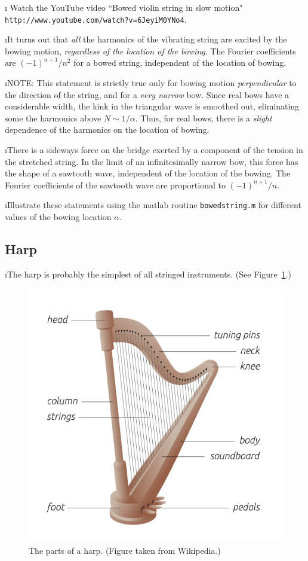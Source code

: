 \i \demo
Watch the YouTube video
``Bowed violin string in slow motion"\\
{\tt http://www.youtube.com/watch?v=6JeyiM0YNo4}.

\i It turns out that {\em all} the harmonics of 
the vibrating string are excited by the bowing motion, 
{\em regardless of the location of the bowing}.
The Fourier coefficients are $(-1)^{n+1}/n^2$
for a bowed string, independent of the location of bowing.

\i NOTE:
This statement is strictly true only for bowing 
motion {\em perpendicular} to the direction of 
the string, and for a {\em very narrow} bow.
Since real bows have a considerable width,
the kink in the triangular wave is smoothed out, 
eliminating some the harmonics above 
$N\sim 1/\alpha$.
Thus, for real bows, there is a {\em slight} 
dependence of the harmonics on the location of bowing.

\i There is a sideways force on the bridge 
exerted by a component of the 
tension in the stretched string.
In the limit of an infinitesimally narrow bow, this
force has the shape of a sawtooth wave, independent
of the location of the bowing.
The Fourier coefficients of the sawtooth wave
are proportional to $(-1)^{n+1}/n$.

\i \demo Illustrate these statements using the 
matlab routine {\tt bowedstring.m} for different
values of the bowing location $\alpha$.

\ei
\subsection{Harp}
\bi

\i The harp is probably the simplest of all stringed
instruments.
(See Figure~\ref{f:harp}.)
%
\begin{figure}[htbp]
\begin{center}
\includegraphics[width=.8\textwidth]{Harp.png}
\caption{The parts of a harp.
(Figure taken from Wikipedia.)}
\label{f:harp}
\end{center}
\end{figure}

